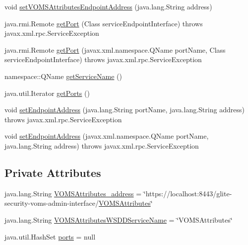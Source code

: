 \begin{DoxyCompactItemize}
\item 
void \hyperlink{classorg_1_1glite_1_1security_1_1voms_1_1service_1_1attributes_1_1VOMSAttributesServiceLocator_acb1b048c653fe99a9c5fe76a4fa05728}{setVOMSAttributesEndpointAddress} (java.lang.String address)
\item 
java.rmi.Remote \hyperlink{classorg_1_1glite_1_1security_1_1voms_1_1service_1_1attributes_1_1VOMSAttributesServiceLocator_a536f7167dbc52e91c9f4bd86e306baa7}{getPort} (Class serviceEndpointInterface)  throws javax.xml.rpc.ServiceException 
\item 
java.rmi.Remote \hyperlink{classorg_1_1glite_1_1security_1_1voms_1_1service_1_1attributes_1_1VOMSAttributesServiceLocator_a28b614d112f3188112e85931c861d235}{getPort} (javax.xml.namespace.QName portName, Class serviceEndpointInterface)  throws javax.xml.rpc.ServiceException 
\item 
namespace::QName \hyperlink{classorg_1_1glite_1_1security_1_1voms_1_1service_1_1attributes_1_1VOMSAttributesServiceLocator_a6adbfc86c617093226d6b702a9cd1a74}{getServiceName} ()
\item 
java.util.Iterator \hyperlink{classorg_1_1glite_1_1security_1_1voms_1_1service_1_1attributes_1_1VOMSAttributesServiceLocator_ac812080689409375094e2714e96c231a}{getPorts} ()
\item 
void \hyperlink{classorg_1_1glite_1_1security_1_1voms_1_1service_1_1attributes_1_1VOMSAttributesServiceLocator_a055f93f88053420b75ff6f44b833bd52}{setEndpointAddress} (java.lang.String portName, java.lang.String address)  throws javax.xml.rpc.ServiceException 
\item 
void \hyperlink{classorg_1_1glite_1_1security_1_1voms_1_1service_1_1attributes_1_1VOMSAttributesServiceLocator_a4a450c3fba4820d7d21cb8e7ec0e0591}{setEndpointAddress} (javax.xml.namespace.QName portName, java.lang.String address)  throws javax.xml.rpc.ServiceException 
\end{DoxyCompactItemize}
\subsection*{Private Attributes}
\begin{DoxyCompactItemize}
\item 
java.lang.String \hyperlink{classorg_1_1glite_1_1security_1_1voms_1_1service_1_1attributes_1_1VOMSAttributesServiceLocator_ad60712619f4629f1ba9ce1eef12e53e3}{VOMSAttributes\_\-address} = \char`\"{}https://localhost:8443/glite-\/security-\/voms-\/admin-\/interface/\hyperlink{interfaceorg_1_1glite_1_1security_1_1voms_1_1service_1_1attributes_1_1VOMSAttributes}{VOMSAttributes}\char`\"{}
\item 
java.lang.String \hyperlink{classorg_1_1glite_1_1security_1_1voms_1_1service_1_1attributes_1_1VOMSAttributesServiceLocator_a67693b0915b16c01b7a636c852553fdd}{VOMSAttributesWSDDServiceName} = \char`\"{}VOMSAttributes\char`\"{}
\item 
java.util.HashSet \hyperlink{classorg_1_1glite_1_1security_1_1voms_1_1service_1_1attributes_1_1VOMSAttributesServiceLocator_a7cab52fba256a99846d9b38a0bda3c88}{ports} = null
\end{DoxyCompactItemize}


